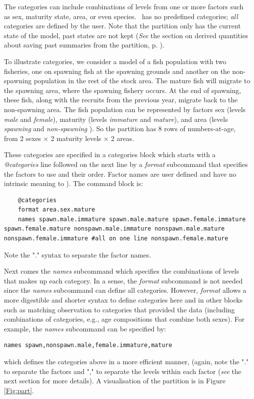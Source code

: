 The categories can include combinations of levels from one or more  factors such as sex, maturity state, area, or even species. \CNAME~has no predefined categories; \emph{all} categories are defined by the user.
Note that the partition only has the current state of the model, past states are not kept (\textit{See} the section on derived quantities about saving past summaries from the partition, p. \pageref{sec:derived-quantities} ).



To illustrate categories, we consider a model of a fish population with  two fisheries, one on spawning fish at the spawning grounds and another on the  non-spawning population in the rest of the stock area.  The mature fish will migrate to the spawning area, where the spawning fishery occurs. At the end of spawning, these fish, along with the recruits from the previous year, migrate back to the non-spawning area. The fish population can be represented  by factors sex (levels \textit{male} and \textit{female}), maturity (levels \textit{immature} and \textit{mature}), and area (levels \textit{spawning} and \textit{non-spawning} ). So the partition has 8 rows of numbers-at-age, from 2 sexes $\times$ 2 maturity levels $\times$ 2 areas.

These categories are specified in a categories block which starts with a \textit{@categories} line followed on the next line by a \textit{format} subcommand that specifies the factors to use and their order. Factor names are user defined and have no intrinsic meaning to \CNAME). The command block is:

{\small{\begin{lstlisting}
	@categories
	format area.sex.mature
	names spawn.male.immature spawn.male.mature spawn.female.immature spawn.female.mature nonspawn.male.immature nonspawn.male.mature nonspawn.female.immature #all on one line nonspawn.female.mature  
\end{lstlisting}}}  %
Note the "." syntax to separate the factor names.

Next comes the \textit{names} subcommand which specifies the combinations of levels that makes up each category. In a sense, the \textit{format} subcommand is not needed since the \textit{names} subcommand can define all categories. However, \textit{format} allows a more  digestible and shorter syntax to define categories here and in other blocks such as matching observation to categories that provided the data (including combinations of categories, e.g., age compositions that combine both sexes). For example, the \textit{names} subcommand can be specified by:
{\small{\begin{verbatim}names spawn,nonspawn.male,female.immature,mature
\end{verbatim}}}
which defines the categories above in a more efficient manner, (again, note the "." to separate the factors and "," to separate the levels within each factor (\textit{see} the next section for more details). 
A visualisation of the partition is in Figure \ref{Fig:part}.


